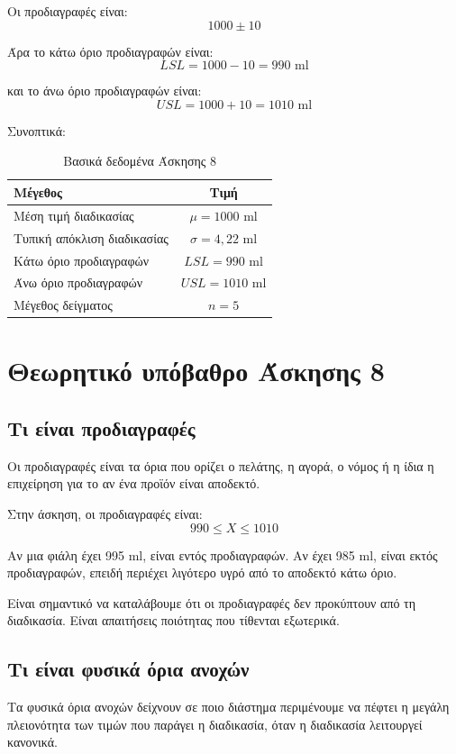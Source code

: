 \documentclass[12pt,a4paper]{article}
\begin{document}
Οι προδιαγραφές είναι:
\[
1000\pm10
\]

Άρα το κάτω όριο προδιαγραφών είναι:
\[
LSL=1000-10=990 \text{ ml}
\]

και το άνω όριο προδιαγραφών είναι:
\[
USL=1000+10=1010 \text{ ml}
\]

Συνοπτικά:

\begin{table}[H]
\centering
\caption{Βασικά δεδομένα Άσκησης 8}
\begin{tabular}{lc}
\toprule
\textbf{Μέγεθος} & \textbf{Τιμή} \\
\midrule
Μέση τιμή διαδικασίας & \(\mu=1000\) ml \\
Τυπική απόκλιση διαδικασίας & \(\sigma=4{,}22\) ml \\
Κάτω όριο προδιαγραφών & \(LSL=990\) ml \\
Άνω όριο προδιαγραφών & \(USL=1010\) ml \\
Μέγεθος δείγματος & \(n=5\) \\
\bottomrule
\end{tabular}
\end{table}

\section{Θεωρητικό υπόβαθρο Άσκησης 8}

\subsection{Τι είναι προδιαγραφές}

Οι προδιαγραφές είναι τα όρια που ορίζει ο πελάτης, η αγορά, ο νόμος ή η ίδια η επιχείρηση για το αν ένα προϊόν είναι αποδεκτό.

Στην άσκηση, οι προδιαγραφές είναι:
\[
990 \leq X \leq 1010
\]

Αν μια φιάλη έχει 995 ml, είναι εντός προδιαγραφών. Αν έχει 985 ml, είναι εκτός προδιαγραφών, επειδή περιέχει λιγότερο υγρό από το αποδεκτό κάτω όριο.

Είναι σημαντικό να καταλάβουμε ότι οι προδιαγραφές δεν προκύπτουν από τη διαδικασία. Είναι απαιτήσεις ποιότητας που τίθενται εξωτερικά.

\subsection{Τι είναι φυσικά όρια ανοχών}

Τα φυσικά όρια ανοχών δείχνουν σε ποιο διάστημα περιμένουμε να πέφτει η μεγάλη πλειονότητα των τιμών που παράγει η διαδικασία, όταν η διαδικασία λειτουργεί κανονικά.
\end{document}
